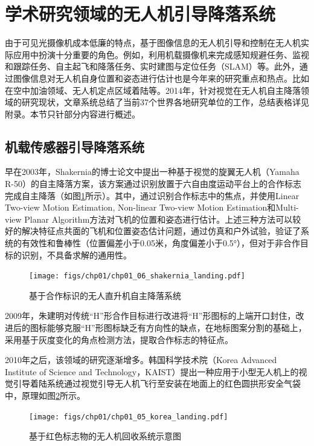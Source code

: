 \section{学术研究领域的无人机引导降落系统}
由于可见光摄像机成本低廉的特点，基于图像信息的无人机引导和控制在无人机实际应用中扮演十分重要的角色。例如，利用机载摄像机来完成感知规避任务\cite{mejias2010vision}、监视和跟踪任务\cite{campoy2009computer}\cite{mejias2006visual}、自主起飞和降落任务\cite{saripalli2002vision}、实时建图与定位任务（SLAM）\cite{weiss2011monocular}等。此外，通过图像信息对无人机自身位置和姿态进行估计也是今年来的研究重点和热点。比如在空中加油领域、无人机定点区域着陆等。2014年，针对视觉在无人机自主降落领域的研究现状，文章\cite{kong2014vision}系统总结了当前37个世界各地研究单位的工作，总结表格详见附录。本节只针部分内容进行概述。

\subsection{机载传感器引导降落系统} 

早在2003年，Shakernia\cite{shakernia2003vision}的博士论文中提出一种基于视觉的旋翼无人机（Yamaha R-50）的自主降落方案，该方案通过识别放置于六自由度运动平台上的合作标志完成自主降落（如图\ref{fig:chp01_06_shakernia_landing}所示）。其中，通过识别合作标志中的焦点，并使用Linear Two-view Motion Estimation, Non-linear Two-view Motion Estimation和Multi-view Planar Algorithm方法对飞机的位置和姿态进行估计。上述三种方法可以较好的解决特征点共面的飞机和位置姿态估计问题，通过仿真和户外试验，验证了系统的有效性和鲁棒性（位置偏差小于0.05米，角度偏差小于0.5°），但对于非合作目标的识别，不具备求解的通用性。

\begin{figure}[!tb]   
	\centering	
	\texttt{[image: figs/chp01/chp01\_06\_shakernia\_landing.pdf]}
	\caption{基于合作标识的无人直升机自主降落系统}
	\label{fig:chp01_06_shakernia_landing}
\end{figure}


2009年，朱建明\cite{Zhu_Master_2009}对传统“H”形合作目标进行改进将“H”形图标的上端开口封住，改进后的图标能够克服“H”形图标缺乏有方向性的缺点，在地标图案分割的基础上，采用基于灰度变化的角点检测方法，提取合作标志的特征点。

2010年之后，该领域的研究逐渐增多。韩国科学技术院（Korea Advanced Institute of Science and Technology，KAIST）提出一种应用于小型无人机上的视觉引导着陆系统通过视觉引导无人机飞行至安装在地面上的红色圆拱形安全气袋中\cite{huh2010vision}，原理如图\ref{fig:chp01_05_korea_landing}所示。
\begin{figure}[!tb]   
	\centering	
	\texttt{[image: figs/chp01/chp01\_05\_korea\_landing.pdf]}
	\caption{基于红色标志物的无人机回收系统示意图}
	\label{fig:chp01_05_korea_landing}
\end{figure}

